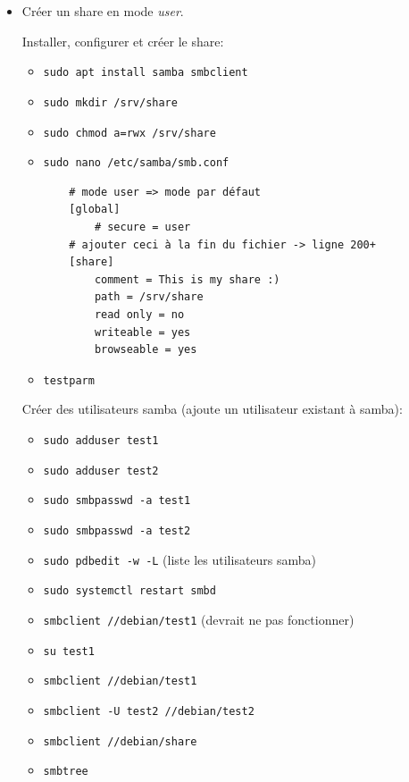 \documentclass[a4paper]{article}
\begin{document}
\begin{itemize}

\item Créer un share en mode \textit{user}.
\begin{example}
    Installer, configurer et créer le share:
    \begin{itemize}
        \item \texttt{sudo apt install samba smbclient}
        \item \texttt{sudo mkdir /srv/share}
        \item \texttt{sudo chmod a=rwx /srv/share}
        \item \texttt{sudo nano /etc/samba/smb.conf}
        \begin{verbatim}
    # mode user => mode par défaut
    [global]
        # secure = user
    # ajouter ceci à la fin du fichier -> ligne 200+
    [share]
        comment = This is my share :)
        path = /srv/share
        read only = no
        writeable = yes
        browseable = yes
        \end{verbatim}
        \item \texttt{testparm}
    \end{itemize}
    Créer des utilisateurs samba (ajoute un utilisateur existant à samba):
    \begin{itemize}
        \item \texttt{sudo adduser test1}
        \item \texttt{sudo adduser test2}
        \item \texttt{sudo smbpasswd -a test1}
        \item \texttt{sudo smbpasswd -a test2}
        \item \texttt{sudo pdbedit -w -L} (liste les utilisateurs samba)
        \item \texttt{sudo systemctl restart smbd}
        \item \texttt{smbclient //debian/test1} (devrait ne pas fonctionner)
        \item \texttt{su test1}
        \item \texttt{smbclient //debian/test1}
        \item \texttt{smbclient -U test2 //debian/test2}
        \item \texttt{smbclient //debian/share}
        \item \texttt{smbtree}
    \end{itemize}
\end{example}


\end{itemize}
\end{document}
